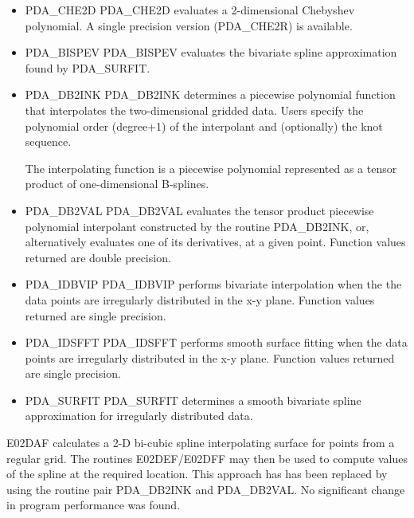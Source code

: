 \documentclass[11pt,twoside]{article}
\newcommand{\htmlref}[2]{#1}
\begin{document}
\begin{itemize}

\item \htmlref{PDA\_CHE2D}{PDA\_CHE2D}
   PDA\_CHE2D evaluates a 2-dimensional Chebyshev polynomial. A single
   precision version (PDA\_CHE2R) is available.

\item \htmlref{PDA\_BISPEV}{PDA\_BISPEV}
   PDA\_BISPEV evaluates the bivariate spline approximation found by 
   PDA\_SURFIT.
 
\item \htmlref{PDA\_DB2INK}{PDA\_DB2INK}
   PDA\_DB2INK determines a piecewise polynomial function that
   interpolates the two-dimensional gridded data. Users specify
   the polynomial order (degree+1) of the interpolant and
   (optionally) the knot sequence.

   The interpolating  function  is  a  piecewise  polynomial
   represented as a tensor product of one-dimensional  B-splines. 

\item \htmlref{PDA\_DB2VAL}{PDA\_DB2VAL}   
    PDA\_DB2VAL evaluates  the  tensor product piecewise  polynomial
    interpolant constructed by the routine PDA\_DB2INK, or, 
    alternatively evaluates one of its derivatives, at a given point. 
    Function values returned are double precision.

\item \htmlref{PDA\_IDBVIP}{PDA\_IDBVIP}
     PDA\_IDBVIP performs bivariate interpolation when the 
     the data points are irregularly distributed in the x-y plane.
     Function values returned are single precision.

\item \htmlref{PDA\_IDSFFT}{PDA\_IDSFFT}
     PDA\_IDSFFT performs smooth surface fitting when the data points 
     are irregularly distributed in the x-y plane. 
     Function values returned are single precision.

\item \htmlref{PDA\_SURFIT}{PDA\_SURFIT}
     PDA\_SURFIT determines a smooth bivariate spline approximation for
     irregularly distributed data.

\end{itemize}


E02DAF calculates a 2-D bi-cubic spline interpolating surface 
for points from a regular grid. The routines E02DEF/E02DFF may then
be used to compute values of the spline at the required location.
This approach has has been replaced by using the routine pair PDA\_DB2INK 
and PDA\_DB2VAL. No significant change in program performance
was found. 
\end{document}
